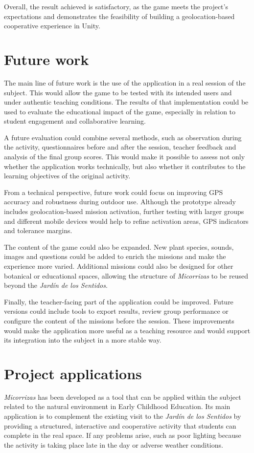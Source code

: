 Overall, the result achieved is satisfactory, as the game meets the project’s expectations and demonstrates the feasibility of building a geolocation-based cooperative experience in Unity.


\section{Future work}
The main line of future work is the use of the application in a real session of the subject. This would allow the game to be tested with its intended users and under authentic teaching conditions. The results of that implementation could be used to evaluate the educational impact of the game, especially in relation to student engagement and collaborative learning.

A future evaluation could combine several methods, such as observation during the activity, questionnaires before and after the session, teacher feedback and analysis of the final group scores. This would make it possible to assess not only whether the application works technically, but also whether it contributes to the learning objectives of the original activity.

From a technical perspective, future work could focus on improving GPS accuracy and robustness during outdoor use. Although the prototype already includes geolocation-based mission activation, further testing with larger groups and different mobile devices would help to refine activation areas, GPS indicators and tolerance margins.

The content of the game could also be expanded. New plant species, sounds, images and questions could be added to enrich the missions and make the experience more varied. Additional missions could also be designed for other botanical or educational spaces, allowing the structure of \textit{Micorrizas} to be reused beyond the \textit{Jardín de los Sentidos}.

Finally, the teacher-facing part of the application could be improved. Future versions could include tools to export results, review group performance or configure the content of the missions before the session. These improvements would make the application more useful as a teaching resource and would support its integration into the subject in a more stable way.

\section{Project applications}
\textit{Micorrizas} has been developed as a tool that can be applied within the subject related to the natural environment in Early Childhood Education. Its main application is to complement the existing visit to the \textit{Jardín de los Sentidos} by providing a structured, interactive and cooperative activity that students can complete in the real space. If any problems arise, such as poor lighting because the activity is taking place late in the day or adverse weather conditions.

